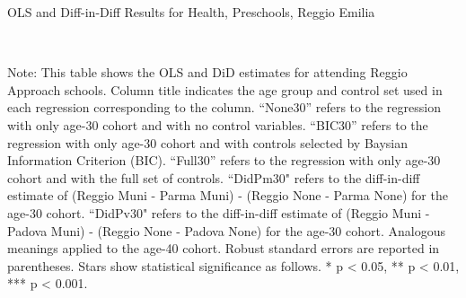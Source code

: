 \begin{landscape}

\begin{table}[H] \caption{OLS and Diff-in-Diff Results for Health, Preschools, Reggio Emilia} \label{ols-H-reg}
\scalebox{0.77}{
}
\vspace{1ex} \\
\footnotesize\raggedright{Note: This table shows the OLS and DiD estimates for attending Reggio Approach schools. Column title indicates the age group and control set used in each regression corresponding to the column. ``None30'' refers to the regression with only age-30 cohort and with no control variables. ``BIC30'' refers to the regression with only age-30 cohort and with controls selected by Baysian Information Criterion (BIC). ``Full30'' refers to the regression with only age-30 cohort and with the full set of controls. ``DidPm30" refers to the diff-in-diff estimate of (Reggio Muni - Parma Muni) - (Reggio None - Parma None) for the age-30 cohort. ``DidPv30" refers to the diff-in-diff estimate of (Reggio Muni - Padova Muni) - (Reggio None - Padova None) for the age-30 cohort. Analogous meanings applied to the age-40 cohort. Robust standard errors are reported in parentheses. Stars show statistical significance as follows. * p < 0.05, ** p < 0.01, *** p < 0.001.}
\end{table}




\end{landscape}

